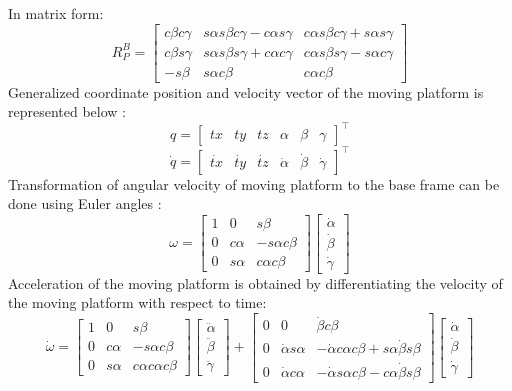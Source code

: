 In matrix form:
\[ R_{P}^B =
 \begin{bmatrix}
 c\beta c\gamma & s\alpha s\beta c\gamma - c\alpha s\gamma & c\alpha s\beta c\gamma + s\alpha s\gamma\\
 c\beta s\gamma & s\alpha s\beta s\gamma + c\alpha c\gamma & c\alpha s\beta s\gamma - s\alpha c\gamma\\
 -s\beta & s\alpha c\beta & c\alpha c\beta  
 \end{bmatrix}
\]
Generalized coordinate position and velocity vector of the moving platform is represented below \cite{csumnu2017simulation}:
\[
q=
\begin{bmatrix}
tx & ty & tz & \alpha & \beta & \gamma
\end{bmatrix}^\top
\]
\[
\dot{q}=
\begin{bmatrix}
\dot{tx} & \dot{ty} & \dot{tz} & \dot{\alpha} & \dot{\beta} & \dot{\gamma}
\end{bmatrix}^\top
\]
Transformation of angular velocity of moving platform to the base frame can be done using Euler angles \cite{csumnu2017simulation}:
\[
\omega =
\begin{bmatrix}
1 & 0 & s\beta \\
0 & c\alpha & -s\alpha c\beta \\
0 & s\alpha & c\alpha c\beta 
\end{bmatrix}
\begin{bmatrix}
\dot{\alpha} \\
\dot{\beta}\\
\dot{\gamma}
\end{bmatrix}
\]
Acceleration of the moving platform is obtained by differentiating the velocity of the moving platform with respect to time:
\[
\dot{\omega} =
\begin{bmatrix}
1 & 0 & s\beta \\
0 & c\alpha & -s\alpha c\beta \\
0 & s\alpha & c\alpha c\alpha c\beta 
\end{bmatrix}
\begin{bmatrix}
\ddot{\alpha} \\
\ddot{\beta}\\
\ddot{\gamma}
\end{bmatrix}
+
\begin{bmatrix}
0 & 0 & \dot{\beta}c\beta \\
0 & \dot{\alpha} s\alpha & -\dot{\alpha} c\alpha c\beta + s\alpha \dot{\beta} s\beta \\
0 & \dot{\alpha}c\alpha & -\dot{\alpha}s\alpha c\beta - c\alpha \dot{\beta}s\beta
\end{bmatrix}
\begin{bmatrix}
\dot{\alpha} \\
\dot{\beta}\\
\dot{\gamma}
\end{bmatrix}
\]
